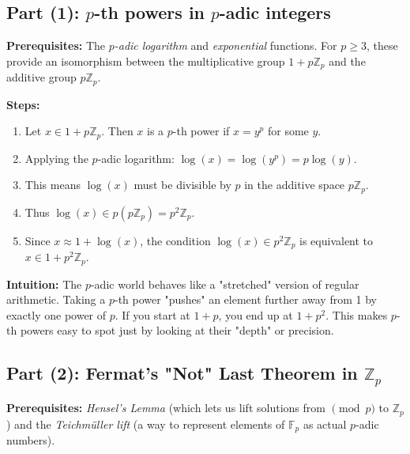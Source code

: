 \begin{solution}
\subsection*{Part (1): $p$-th powers in $p$-adic integers}

\textbf{Prerequisites:} 
The \textit{$p$-adic logarithm} and \textit{exponential} functions. For $p \geq 3$, these provide an isomorphism between the multiplicative group $1 + p\mathbb{Z}_p$ and the additive group $p\mathbb{Z}_p$.

\textbf{Steps:}
\begin{enumerate}
    \item Let $x \in 1 + p\mathbb{Z}_p$. Then $x$ is a $p$-th power if $x = y^p$ for some $y$.
    \item Applying the $p$-adic logarithm: $\log(x) = \log(y^p) = p \log(y)$.
    \item This means $\log(x)$ must be divisible by $p$ in the additive space $p\mathbb{Z}_p$.
    \item Thus $\log(x) \in p(p\mathbb{Z}_p) = p^2 \mathbb{Z}_p$.
    \item Since $x \approx 1 + \log(x)$, the condition $\log(x) \in p^2 \mathbb{Z}_p$ is equivalent to $x \in 1 + p^2 \mathbb{Z}_p$.
\end{enumerate}

\textbf{Intuition:}
The $p$-adic world behaves like a "stretched" version of regular arithmetic. Taking a $p$-th power "pushes" an element further away from 1 by exactly one power of $p$. If you start at $1+p$, you end up at $1+p^2$. This makes $p$-th powers easy to spot just by looking at their "depth" or precision.

\par\vspace{1.5em}

\subsection*{Part (2): Fermat's "Not" Last Theorem in $\mathbb{Z}_p$}

\textbf{Prerequisites:} 
\textit{Hensel's Lemma} (which lets us lift solutions from $\pmod p$ to $\mathbb{Z}_p$) and the \textit{Teichmüller lift} (a way to represent elements of $\mathbb{F}_p$ as actual $p$-adic numbers).


\end{solution}
